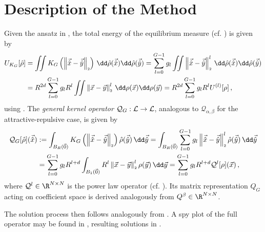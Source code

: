 
\section{Description of the Method}
Given the ansatz in , the total energy of the equilibrium measure (cf. ) is given by
\begin{align*}
  U_{K_G}[\hat{\rho}] & = \iint K_G\left(\norm{\hatvec{x}-\hatvec{y}}\right) \,\dd\hat{\rho}(\hatvec{x})\dd\hat{\rho}(\hatvec{y})
  = \sum_{l=0}^{G-1} g_l \iint \norm{\hatvec{x}-\hatvec{y}}^l \,\dd\hat{\rho}(\hatvec{x})\dd\hat{\rho}(\hatvec{y})                \\
                      & = R^{2d} \sum_{l=0}^{G-1} g_l R^l \iint \norm{\vec{x}-\vec{y}}^l \,\dd\rho(\vec{x})\dd\rho(\vec{y})
  = R^{2d} \sum_{l=0}^{G-1} g_l R^l U^{(l)}[\rho]\,,
\end{align*}
using .
The \textit{general kernel operator} $\mathcal{Q}_G: \mathcal{L} \to \mathcal{L}$, analogous to $\mathcal{Q}_{\alpha,\beta}$ for the attractive-repulsive case, is given by
\begin{align*}
  \mathcal{Q}_G[\hat{\rho}](\hatvec{x}) & := \int_{B_R(\vec{0})} K_{G}\left(\norm{\hatvec{x} - \hatvec{y}}\right) \hat{\rho}(\hatvec{y}) \,\dd\hatvec{y}
  = \int_{B_R(\vec{0})} \sum_{l=0}^{G-1} g_l \norm{\hatvec{x}-\hatvec{y}}^l \hat{\rho}(\hatvec{y}) \,\dd\hatvec{y}                                       \\
                                        & = \sum_{l=0}^{G-1} g_l R^{l+d} \int_{B_1(\vec{0})} R^l\norm{\vec{x} - \vec{y}}^l \rho(\vec{y}) \,\dd\vec{y}
  = \sum_{l=0}^{G-1} g_l R^{l+d} \mathcal{Q}^l[\rho](\vec{x})\,,
\end{align*}
where $\mathcal{Q}^l \in \R^{N \times N}$ is the power law operator (cf. ).
Its matrix representation $Q_G$ acting on coefficient space is derived analogously from $Q^\beta \in \R^{N \times N}$.

The solution process then follows analogously from .
A spy plot of the full operator may be found in , resulting solutions in .


